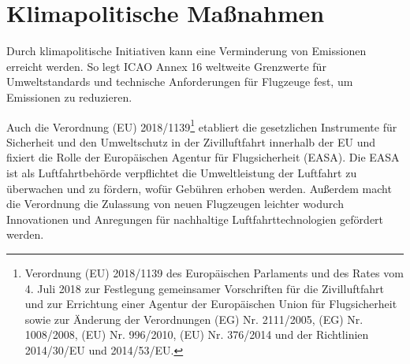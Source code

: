\section{Klimapolitische Maßnahmen}
\label{s:Klimapolitische Maßnahmen}


Durch klimapolitische Initiativen kann eine Verminderung von Emissionen erreicht werden. 
So legt ICAO Annex 16 weltweite Grenzwerte für Umweltstandards und technische Anforderungen
für Flugzeuge fest, um Emissionen zu reduzieren.

Auch die Verordnung (EU) 2018/1139\footnote{Verordnung (EU) 2018/1139 des Europäischen Parlaments und des Rates vom 4. Juli 2018 
zur Festlegung gemeinsamer Vorschriften für die Zivilluftfahrt und zur Errichtung einer Agentur
der Europäischen Union für Flugsicherheit sowie zur Änderung der Verordnungen (EG) Nr. 2111/2005, 
(EG) Nr. 1008/2008, (EU) Nr. 996/2010, (EU) Nr. 376/2014 und der Richtlinien 2014/30/EU und 2014/53/EU.} 
%
etabliert die gesetzlichen Instrumente 
für Sicherheit und den Umweltschutz in der Zivilluftfahrt innerhalb der EU 
und fixiert die Rolle der Europäischen Agentur für Flugsicherheit (EASA). 
Die EASA ist als Luftfahrtbehörde verpflichtet die Umweltleistung der Luftfahrt 
zu überwachen und zu fördern, wofür Gebühren erhoben werden. 
Außerdem macht die Verordnung die Zulassung von neuen Flugzeugen leichter 
wodurch Innovationen und Anregungen für nachhaltige Luftfahrttechnologien gefördert werden.

